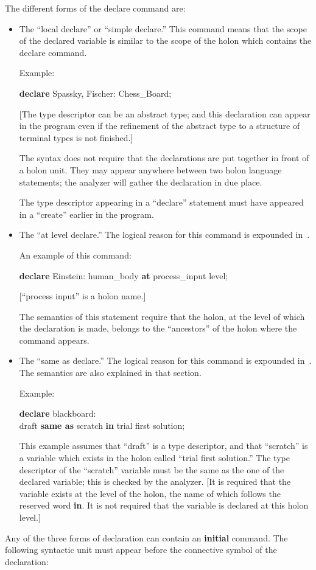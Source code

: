 \documentclass[openany,nobib]{tufte-book}
\newcommand{\kw}[1]{{\bf #1}}
\begin{document}
The different forms of the declare command are:
\begin{itemize}
    \item[(a)] The ``local declare'' or ``simple declare.'' This command means
that the scope of the declared variable is similar to the scope of the holon
which contains the declare command.

    Example:

    \-\hspace{0.4cm} \kw{declare} Spassky, Fischer: Chess\_Board;

    [The type descriptor can be an abstract type; and this declaration can
appear in the program even if the refinement of the abstract type to a
structure of terminal types is not finished.]

    The syntax does not require that the declarations are put together in front
of a holon unit. They may appear anywhere between two holon language
statements; the analyzer will gather the declaration in due place.

    The type descriptor appearing in a ``declare'' statement must have appeared
in a ``create'' earlier in the program.
    \item[(b)] The ``at level declare.'' The logical reason for this command is
expounded in~.

    An example of this command:

    \-\hspace{0.4cm} \kw{declare} Einstein: human\_body \kw{at}
process\_input level;

    [``process input'' is a holon name.]

    The semantics of this statement require that the holon, at the level of
which the declaration is made, belongs to the ``ancestors'' of the holon where
the command appears.
    \item[(c)] The ``same as declare.'' The logical reason for this command is
expounded in~. The semantics are also explained in
that section.

    Example:

\-\hspace{0.4cm} \kw{declare} blackboard:\\
\-\hspace{1cm}draft \kw{same as} scratch \kw{in} trial first solution;

This example assumes that ``draft'' is a type descriptor, and that ``scratch''
is a variable which exists in the holon called ``trial first solution.'' The
type descriptor of the ``scratch'' variable must be the same as the one of the
declared variable; this is checked by the analyzer. [It is required that the
variable exists at the level of the holon, the name of which follows the
reserved word \kw{in}. It is not required that the variable is declared at
this holon level.]
\end{itemize}
Any of the three forms of declaration can contain an \kw{initial} command. The
following syntactic unit must appear before the connective symbol of the
declaration:
\medskip
\end{document}
